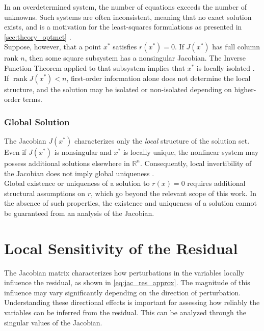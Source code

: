 In an overdetermined system, the number of equations exceeds the number of unknowns. Such systems are often inconsistent, meaning that no exact solution exists, and is a motivation for the least-squares formulations as presented in \autoref{sec:theory_optmet} \cite[p.~37]{beck2014nonlinearoptimization}.\\

Suppose, however, that a point $x^\ast$ satisfies $r(x^\ast)=0$. If $J(x^\ast)$ has full column rank $n$, then some square subsystem has a nonsingular Jacobian. The Inverse Function Theorem applied to that subsystem implies that $x^\ast$ is locally isolated \cite[pp.~657-660]{lee2013smooth}. \\

If $\operatorname{rank} J(x^\ast)<n$, first-order information alone does not determine the local structure, and the solution may be isolated or non-isolated depending on higher-order terms.

\newpage
\subsubsection*{Global Solution}

The Jacobian $J(x^\ast)$ characterizes only the \emph{local} structure of the solution set. Even if $J(x^\ast)$ is nonsingular and $x^\ast$ is locally unique, the nonlinear system may possess additional solutions elsewhere in $\mathbb{R}^n$. Consequently, local invertibility of the Jacobian does not imply global uniqueness \cite[pp.~657-660]{lee2013smooth}. \\

Global existence or uniqueness of a solution to $r(x)=0$ requires additional structural assumptions on $r$, which go beyond the relevant scope of this work. In the absence of such properties, the existence and uniqueness of a solution cannot be guaranteed from an analysis of the Jacobian.

\section{Local Sensitivity of the Residual}

The Jacobian matrix characterizes how perturbations in the variables locally influence the residual, as shown in \cref{eq:jac_res_approx}. The magnitude of this influence may vary significantly depending on the direction of perturbation. Understanding these directional effects is important for assessing how reliably the variables can be inferred from the residual. This can be analyzed through the singular values of the Jacobian.

